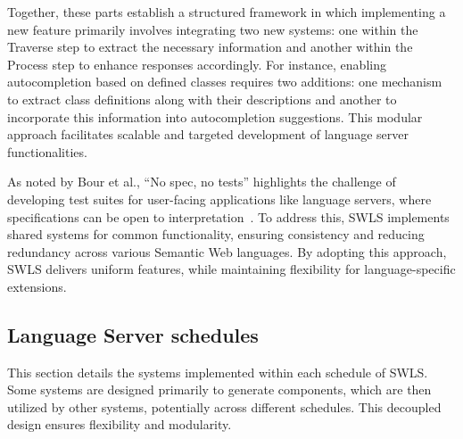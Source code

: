 Together, these parts establish a structured framework in which implementing a new feature primarily involves integrating two new systems: one within the Traverse step to extract the necessary information and another within the Process step to enhance responses accordingly.
For instance, enabling autocompletion based on defined classes requires two additions: one mechanism to extract class definitions along with their descriptions and another to incorporate this information into autocompletion suggestions. 
This modular approach facilitates scalable and targeted development of language server functionalities.

As noted by Bour et al., ``No spec, no tests'' highlights the challenge of developing test suites for user-facing applications like language servers, where specifications can be open to interpretation~\cite{Bour_2018}. 
To address this, SWLS implements shared systems for common functionality, ensuring consistency and reducing redundancy across various Semantic Web languages.
By adopting this approach, SWLS delivers uniform features, while maintaining flexibility for language-specific extensions.


\subsection{Language Server schedules}

This section details the systems implemented within each schedule of SWLS.
Some systems are designed primarily to generate components, which are then utilized by other systems, potentially across different schedules.
This decoupled design ensures flexibility and modularity. 

